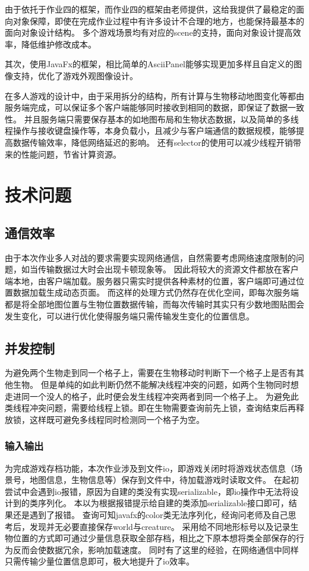 \documentclass{SCIS2022cn}
\begin{document}
由于依托于作业四的框架，而作业四的框架由老师提供，这给我提供了最稳定的面向对象保障，即使在完成作业过程中有许多设计不合理的地方，也能保持最基本的面向对象设计结构。
多个游戏场景均有对应的scene的支持，面向对象设计提高效率，降低维护修改成本。

其次，使用JavaFx的框架，相比简单的AsciiPanel能够实现更加多样且自定义的图像支持，优化了游戏外观图像设计。

在多人游戏的设计中，由于采用拆分的结构，所有计算与生物移动地图变化等都由服务端完成，可以保证多个客户端能够同时接收到相同的数据，即保证了数据一致性。
并且服务端只需要保存基本的如地图布局和生物状态数据，以及简单的多线程操作与接收键盘操作等，本身负载小，且减少与客户端通信的数据规模，能够提高数据传输效率，降低网络延迟的影响。
还有selector的使用可以减少线程开销带来的性能问题，节省计算资源。

\section{技术问题}

\subsection{通信效率}

由于本次作业多人对战的要求需要实现网络通信，自然需要考虑网络速度限制的问题，如当传输数据过大时会出现卡顿现象等。
因此将较大的资源文件都放在客户端本地，由客户端加载。服务器只需实时提供各种素材的位置，客户端即可通过位置数据加载生成动态页面。
而这样的处理方式仍然存在优化空间，即每次服务端都是将全部地图位置与生物位置数据传输，而每次传输时其实只有少数地图贴图会发生变化，可以进行优化使得服务端只需传输发生变化的位置信息。

\subsection{并发控制}

为避免两个生物走到同一个格子上，需要在生物移动时判断下一个格子上是否有其他生物。
但是单纯的如此判断仍然不能解决线程冲突的问题，如两个生物同时想走进同一个没人的格子，此时便会发生线程冲突两者到同一个格子上。
为避免此类线程冲突问题，需要给线程上锁。即在生物需要查询前先上锁，查询结束后再释放锁，这样既可避免多线程同时检测同一个格子为空。

\subsubsection{输入输出}

为完成游戏存档功能，本次作业涉及到文件io，即游戏关闭时将游戏状态信息（场景号，地图信息，生物信息等）保存到文件中，待加载游戏时读取文件。
在起初尝试中会遇到io报错，原因为自建的类没有实现serializable，即io操作中无法将设计到的类序列化。
本以为根据报错提示给自建的类添加serializable接口即可，结果还是遇到了报错。
查询可知javafx的color类无法序列化，经询问老师及自己思考后，发现并无必要直接保存world与creature。
采用给不同地形标号以及记录生物位置的方式即可通过少量信息获取全部存档，相比之下原本想将类全部保存的行为反而会使数据冗余，影响加载速度。
同时有了这里的经验，在网络通信中同样只需传输少量位置信息即可，极大地提升了io效率。
\end{document}
